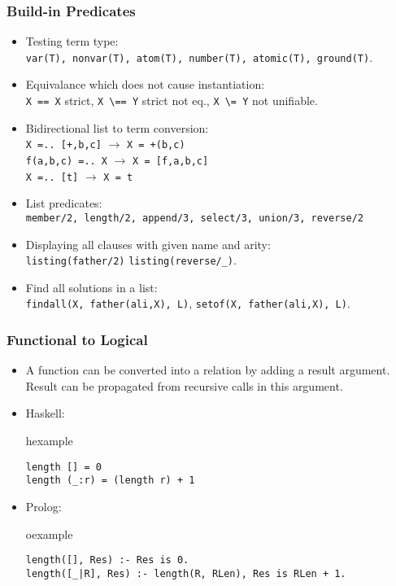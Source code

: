 \begin{frame}[fragile]
\frametitle{Build-in Predicates}
\begin{itemize}
\item Testing term type:\\
\lstinline!var(T), nonvar(T), atom(T), number(T), atomic(T), ground(T)!.\\
\item Equivalance which does not cause instantiation:\\
\lstinline!X == X! strict, \lstinline!X \== Y! strict not eq., \lstinline!X \= Y! not unifiable. 
\item Bidirectional list to term conversion:\\
\lstinline!X =.. [+,b,c]! $\rightarrow$ \lstinline!X = +(b,c)!\\
\lstinline!f(a,b,c) =.. X! $\rightarrow$ \lstinline!X = [f,a,b,c]!\\
\lstinline!X =.. [t]! $\rightarrow$ \lstinline!X = t!\\
\item List predicates:\\
\lstinline!member/2, length/2, append/3, select/3, union/3, reverse/2!
\item Displaying all clauses with given name and arity:\\
\lstinline!listing(father/2)! \lstinline!listing(reverse/_)!.
\item Find all solutions in a list:\\
\lstinline!findall(X, father(ali,X), L)!, \lstinline!setof(X, father(ali,X), L)!.
\end{itemize}
\end{frame}


\begin{frame}[fragile]
\frametitle{Functional to Logical}
\begin{itemize}
\item A function can be converted into a relation by adding a result
argument. Result can be propagated from recursive calls in this argument.
\item Haskell:\\
\begin{beamercolorbox}{hexample}
\begin{lstlisting}[escapeinside=`']
length [] = 0
length (_:r) = (length r) + 1
\end{lstlisting}
\end{beamercolorbox}
\item Prolog:\\
\begin{beamercolorbox}{oexample}
\begin{lstlisting}[escapeinside=`']
length([], Res) :- Res is 0.
length([_|R], Res) :- length(R, RLen), Res is RLen + 1.
\end{lstlisting}
\end{beamercolorbox}
\end{itemize}
\end{frame}

